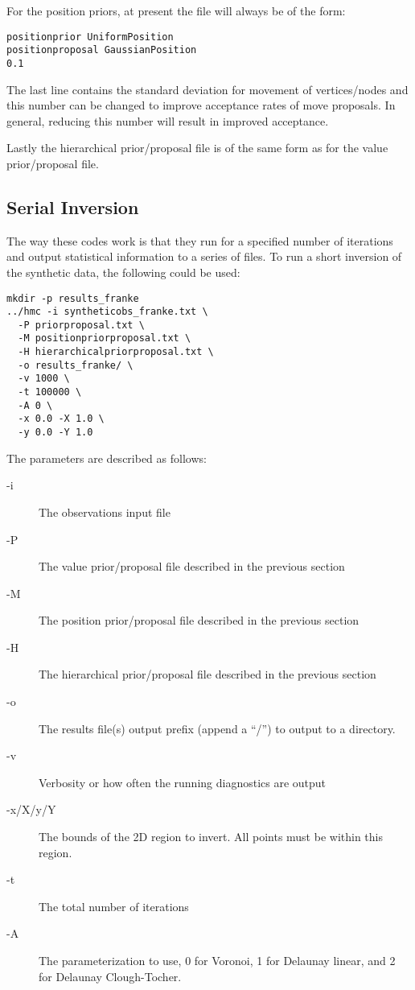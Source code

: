\documentclass[a4paper,12pt]{article}
\begin{document}
For the position priors, at present the file will always be of the
form:

\begin{verbatim}
positionprior UniformPosition
positionproposal GaussianPosition
0.1
\end{verbatim}

The last line contains the standard deviation for movement of vertices/nodes
and this number can be changed to improve acceptance rates of move proposals.
In general, reducing this number will result in improved acceptance.

Lastly the hierarchical prior/proposal file is of the same form as for
the value prior/proposal file. 

\subsection{Serial Inversion}

The way these codes work is that they run for a specified number of
iterations and output statistical information to a series of files.
To run a short inversion of the synthetic data, the following
could be used:

\begin{verbatim}
mkdir -p results_franke
../hmc -i syntheticobs_franke.txt \
  -P priorproposal.txt \
  -M positionpriorproposal.txt \
  -H hierarchicalpriorproposal.txt \
  -o results_franke/ \
  -v 1000 \
  -t 100000 \
  -A 0 \
  -x 0.0 -X 1.0 \
  -y 0.0 -Y 1.0
\end{verbatim}

The parameters are described as follows:

\begin{description}
\item [-i] The observations input file
\item [-P] The value prior/proposal file described in the previous section
\item [-M] The position prior/proposal file described in the previous section
\item [-H] The hierarchical prior/proposal file described in the previous section
\item [-o] The results file(s) output prefix (append a ``/'') to output to a
  directory.
\item [-v] Verbosity or how often the running diagnostics are output
\item [-x/X/y/Y] The bounds of the 2D region to invert. All points must be within
  this region.
\item [-t] The total number of iterations
\item [-A] The parameterization to use, 0 for Voronoi, 1 for Delaunay linear, and
  2 for Delaunay Clough-Tocher.
\end{description}
\end{document}
